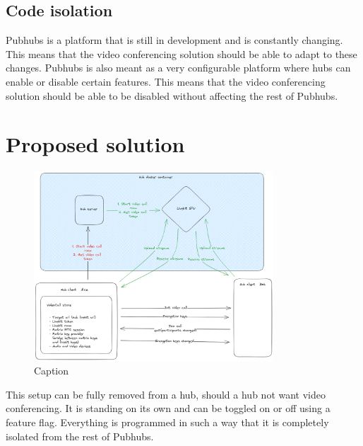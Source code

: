 \documentclass{report}
\begin{document}
\section{Code isolation}
Pubhubs is a platform that is still in development and is constantly changing. This means that the video
conferencing solution should be able to adapt to these changes. Pubhubs is also meant as a very configurable platform
where hubs can enable or disable certain features. This means that the video conferencing solution should be able to
be disabled without affecting the rest of Pubhubs.




\chapter{Proposed solution}
\begin{figure}[!hbt]
\centering
\includegraphics[width=0.8\textwidth]{img/PH_videocall.excalidraw.png}
\caption{Caption}
\label{fig:video-conference-setup}
\end{figure}

This setup can be fully removed from a hub, should a hub not want video conferencing. It is standing on its own and
can be toggled on or off using a feature flag. Everything is programmed in such a way that it is completely isolated
from the rest of Pubhubs.
\end{document}
